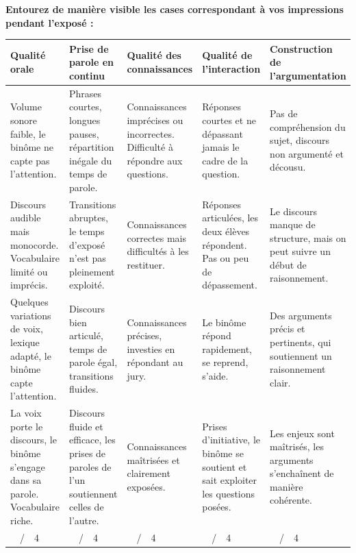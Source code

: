 \documentclass[oneside,12pt]{exam}          %
\begin{document}
\textbf{Entourez de manière visible les cases correspondant à vos impressions pendant l'exposé :}
{\small
\begin{center}
	\renewcommand{\arraystretch}{1.7}
	\begin{tabular}{| P{3.5cm} | P{3.5cm} | P{3.5cm} | P{3.5cm} | P{3.5cm} |} \hline
		 \color{white} \textbf{Qualité orale} & \color{white} \textbf{Prise de parole en continu} & \color{white} \textbf{Qualité des connaissances} & \color{white} \textbf{Qualité de l'interaction} & \color{white} \textbf{Construction de l'argumentation} \\ \hline
		
		Volume sonore faible, le binôme ne capte pas l'attention. &
		Phrases courtes, longues pauses, répartition inégale du temps de parole. &
		Connaissances imprécises ou incorrectes. Difficulté à répondre aux questions. &
		Réponses courtes et ne dépassant jamais le cadre de la question. &
		Pas de compréhension du sujet, discours non argumenté et décousu. \\ \hline
		
		Discours audible mais monocorde. Vocabulaire limité ou imprécis. &
		Transitions abruptes, le temps d'exposé n'est pas pleinement exploité. &
		Connaissances correctes mais difficultés à les restituer. &
		Réponses articulées, les deux élèves répondent. Pas ou peu de dépassement. &
		Le discours manque de structure, mais on peut suivre un début de raisonnement. \\ \hline
		
		Quelques variations de voix, lexique adapté, le binôme capte l'attention. &
		Discours bien articulé, temps de parole égal, transitions fluides. &
		Connaissances précises, investies en répondant au jury. &
		Le binôme répond rapidement, se reprend, s'aide. &
		Des arguments précis et pertinents, qui soutiennent un raisonnement clair. \\ \hline
		
		La voix porte le discours, le binôme s'engage dans sa parole. Vocabulaire riche. &
		Discours fluide et efficace, les prises de paroles de l'un soutiennent celles de l'autre. &
		Connaissances maîtrisées et clairement exposées. &
		Prises d'initiative, le binôme se soutient et sait exploiter les questions posées. &
		Les enjeux sont maîtrisés, les arguments s'enchaînent de manière cohérente. \\ \hline
		
		~~/~~4 & ~~/~~4 & ~~/~~4 & ~~/~~4 & ~~/~~4 \\ \hline
	\end{tabular}
\end{center}
}
\end{document}
